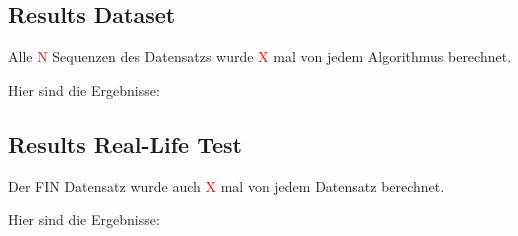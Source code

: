 \documentclass[main.tex]{subfiles}
\begin{document}
\subsection{Results Dataset}

Alle \textcolor{red}{N} Sequenzen des Datensatzs wurde \textcolor{red}{X} mal von jedem Algorithmus berechnet.

Hier sind die Ergebnisse:

\subsection{Results Real-Life Test}

Der FIN Datensatz wurde auch \textcolor{red}{X} mal von jedem Datensatz berechnet.

Hier sind die Ergebnisse:
\end{document}
